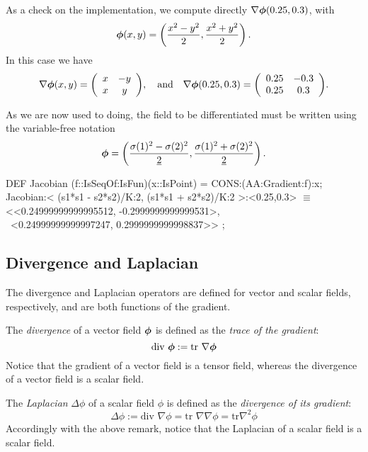 \documentclass{31x47jw}
\begin{document}
As a check on the implementation, we compute directly $\nabla{\mbox{\boldmath $\phi$}}(0.25,
0.3)$, with
\[
{\mbox{\boldmath $\phi$}}(x,y)=\left({x^{2}-y^{2}\over 2}, {x^{2}+y^{2}\over 2}\right).
\]
In this case we have 
\[
\nabla {\mbox{\boldmath $\phi$}}(x,y)
= {\left(\begin{array}{cccccccc}
x  &  -y \\
x  &  y
\end{array}\right)}, \quad\mbox{and}\quad
\nabla {\mbox{\boldmath $\phi$}}(0.25, 0.3)
= {\left(\begin{array}{cccccccc}
0.25  &  -0.3 \\
0.25  &  0.3
\end{array}\right)} .
\]

As we are now used to doing, the field to be differentiated must be written 
using the variable-free notation
\[
{\mbox{\boldmath $\phi$}} = \left(
{\sigma(1)^{2} - \sigma(2)^{2} \over \underline{2}},
{\sigma(1)^{2} + \sigma(2)^{2} \over \underline{2}}
\right).
\]

\begin{script}
\begin{smallplasm} 
DEF Jacobian  (f::IsSeqOf:IsFun)(x::IsPoint) = %
  CONS:(AA:Gradient:f):x;\\[0.3cm]

Jacobian:< (s1*s1 - s2*s2)/K:2, (s1*s1 + s2*s2)/K:2 >:<0.25,0.3> $\equiv$\+\\
<<0.24999999999995512, -0.2999999999999531>, \\
~<0.24999999999997247, 0.2999999999998837>> ;
\end{smallplasm} 
\label{script:5:Jacobian}
\end{script}


\subsection{Divergence and Laplacian}

The divergence and Laplacian operators are defined for vector and 
scalar fields, respectively, and are both functions of the gradient.

The \emph{divergence} of a vector field ${\mbox{\boldmath $\phi$}}$ is defined as the
\emph{trace of the gradient}:
\[
\mbox{div\ } {\mbox{\boldmath $\phi$}} := \mbox{tr }\nabla{\mbox{\boldmath $\phi$}}
\]
Notice that the gradient of a vector field is a tensor field, whereas 
the divergence of a vector field is a scalar field.

The \emph{Laplacian} $\Delta\phi$ of a scalar field $\phi$ is defined as the
\emph{divergence of its gradient}:
\[
\Delta\phi := \mbox{div\ }\nabla \phi = \mbox{tr }\nabla\nabla \phi = \mbox{tr
}\nabla^{2} \phi
\]
Accordingly with the above remark, notice that the Laplacian of a
scalar field is a scalar field.
\end{document}

